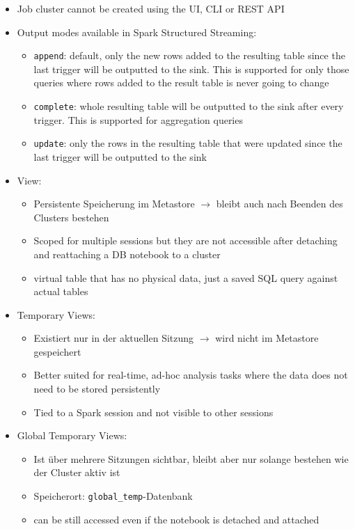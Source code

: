 \documentclass[11pt]{scrartcl}
\begin{document}
\begin{itemize}
	\item Job cluster cannot be created using the UI, CLI or REST API
	\item Output modes available in Spark Structured Streaming:
	\begin{itemize}
		\item \texttt{append}: default, only the new rows added to the resulting table since the last trigger will be outputted to the sink. This is supported for only those queries where rows added to the result table is never going to change
		\item \texttt{complete}: whole resulting table will be outputted to the sink after every trigger. This is supported for aggregation queries
		\item \texttt{update}: only the rows in the resulting table that were updated since the last trigger will be outputted to the sink
	\end{itemize}
	\item View:
	\begin{itemize}
		\item Persistente Speicherung im Metastore $\to$ bleibt auch nach Beenden des Clusters bestehen
		\item Scoped for multiple sessions but they are not accessible after detaching and reattaching a DB notebook to a cluster
		\item virtual table that has no physical data, just a saved SQL query against actual tables
	\end{itemize}
	\item Temporary Views:
	\begin{itemize}
		\item Existiert nur in der aktuellen Sitzung $\to$ wird nicht im Metastore gespeichert
		\item Better suited for real-time, ad-hoc analysis tasks where the data does not need to be stored persistently
		\item Tied to a Spark session and not visible to other sessions
	\end{itemize}
	\item Global Temporary Views:
	\begin{itemize}
		\item Ist über mehrere Sitzungen sichtbar, bleibt aber nur solange bestehen wie der Cluster aktiv ist
		\item Speicherort: \texttt{global\_temp}-Datenbank
		\item can be still accessed even if the notebook is detached and attached

\end{itemize}
\end{itemize}
\end{document}
